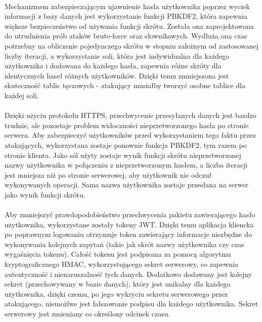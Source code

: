 \documentclass{article}
\begin{document}
    \paragraph{}Mechanizmem zabezpieczającym ujawnienie hasła użytkownika poprzez wyciek informacji z bazy danych jest wykorzystanie funkcji  PBKDF2, która zapewnia większe bezpieczeństwo od używania funkcji skrótu. Została ona zaprojektowana do utrudnienia prób ataków brute-force oraz słownikowych. Wydłuża ona czas potrzebny na obliczenie pojedynczego skrótu w stopniu zależnym od zastosowanej liczby iteracji, a wykorzystanie soli, która jest indywidualna dla każdego użytkownika i dodawana do każdego hasła, zapewnia różne skróty dla identycznych haseł różnych użytkowników. Dzięki temu zmniejszona jest skuteczność tablic tęczowych - atakujący musiałby tworzyć osobne tablice dla każdej soli.

    \paragraph{}Dzięki użyciu protokołu HTTPS, przechwycenie przesyłanych danych jest bardzo trudnie, ale pozostaje problem widoczności nieprzetworzonego hasła po stronie serwera. Aby zabezpieczyć użytkowników przed wykorzystaniem tego faktu przez atakujących, wykorzystana zostaje ponownie funkcja PBKDF2, tym razem po stronie klienta. Jako sól użyty zostaje wynik funkcji skrótu nieprzetworzonej nazwy użytkownika w połączeniu z nieprzetworzonym hasłem, a liczba iteracji jest mniejsza niż po stronie serwerowej, aby użytkownik nie odczuł wykonywanych operacji. Sama nazwa użytkownika zostaje przesłana na serwer jako wynik funkcji skrótu.

    \paragraph{}Aby zmniejszyć prawdopodobieństwo przechwycenia pakietu zawierającego hasło użytkownika, wykorzystane zostały tokeny JWT. Dzięki temu aplikacja kliencka po poprawnym logowaniu otrzymuje token zawierający informacje niezbędne do wykonywania kolejnych zapytań (takie jak skrót nazwy użytkownika czy czas wygaśnięcia tokenu). Całość tokenu jest podpisana za pomocą algorytmu kryptograficznego HMAC, wykorzystującego sekret serwerowy, co zapewnia autentyczność i nienaruszalność tych danych. Dodatkowo dodawany jest kolejny sekret (przechowywany w bazie danych), który jest unikalny dla każdego użytkownika, dzięki czemu, po jego wykryciu sekretu serwerowego przez atakującego, niemożlwe jest fałszowanie podpisu dla każdego użytkownika. Sekret serwerowy jest zmieniany co określony odcinek czasu.
\end{document}

